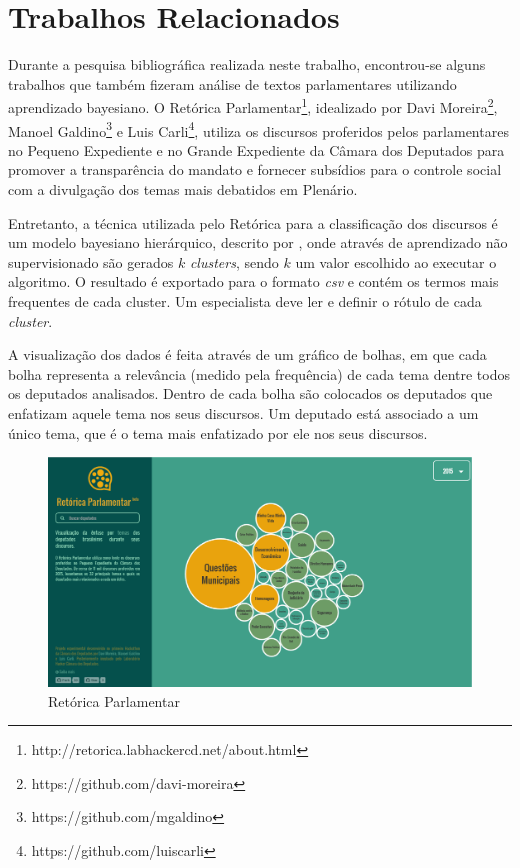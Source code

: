 \section{Trabalhos Relacionados}

Durante a pesquisa bibliográfica realizada neste trabalho, encontrou-se alguns trabalhos que também fizeram análise de textos parlamentares utilizando aprendizado bayesiano. O Retórica Parlamentar\footnote{http://retorica.labhackercd.net/about.html}, idealizado por Davi Moreira\footnote{https://github.com/davi-moreira}, Manoel Galdino\footnote{https://github.com/mgaldino} e Luis Carli\footnote{https://github.com/luiscarli}, utiliza os discursos proferidos pelos parlamentares no Pequeno Expediente e no Grande Expediente da Câmara dos Deputados para promover a transparência do mandato e fornecer subsídios para o controle social com a divulgação dos temas mais debatidos em Plenário.

Entretanto, a técnica utilizada pelo Retórica para a classificação dos discursos é um modelo bayesiano hierárquico, descrito por , onde através de aprendizado não supervisionado são gerados \(k\) \textit{clusters}, sendo \(k\) um valor escolhido ao executar o algoritmo. O resultado é exportado para o formato \textit{csv} e contém os termos mais frequentes de cada cluster. Um especialista deve ler e definir o rótulo de cada \textit{cluster}.

A visualização dos dados é feita através de um gráfico de bolhas, em que cada bolha representa a relevância (medido pela frequência) de cada tema dentre todos os deputados analisados. Dentro de cada bolha são colocados os deputados que enfatizam aquele tema nos seus discursos. Um deputado está associado a um único tema, que é o tema mais enfatizado por ele nos seus discursos.

\begin{figure}[h]
    \centering
    \includegraphics[scale=0.3]{figuras/retorica.eps}
    \caption{Retórica Parlamentar}
\end{figure}
